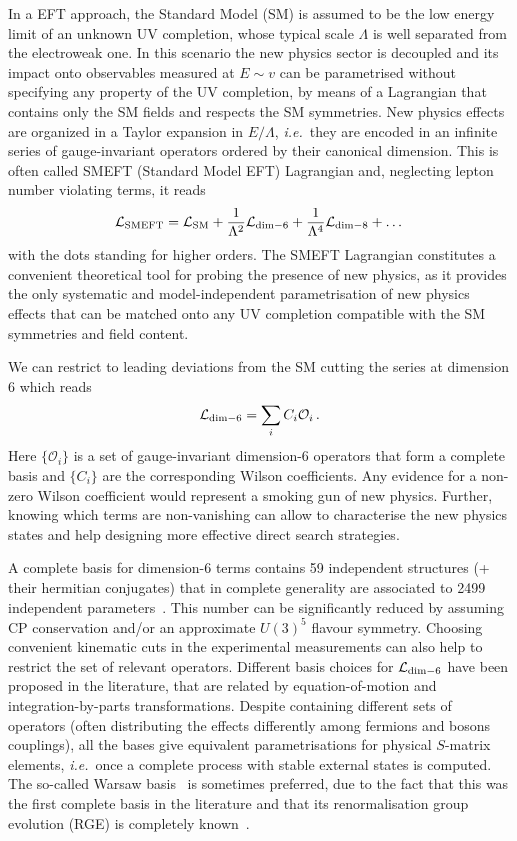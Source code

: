 In a EFT approach, the Standard Model (SM) is assumed to be the low energy limit of an unknown UV completion, whose typical scale $\Lambda$ is well separated from the electroweak one.
In this scenario the new physics sector is decoupled and its impact onto observables measured at $E\sim v$ can be parametrised without specifying any property of the UV completion, by means of a Lagrangian that contains only the SM fields and respects the SM symmetries.
New physics effects are organized in a Taylor expansion in $E/\Lambda$, \emph{i.e.}\ they are encoded in an infinite series of gauge-invariant operators ordered by their canonical dimension.
This is often called SMEFT (Standard Model EFT) Lagrangian and, neglecting lepton number violating terms, it reads
\begin{equation}
 \mathcal{L}_{\rm SMEFT} = \mathcal{L}_{\rm SM} + \frac{1}{\Lambda^2}\mathcal{L}_{\rm dim-6} + \frac{1}{\Lambda^4}\mathcal{L}_{\rm dim-8} + \dots
\end{equation} 
with the dots standing for higher orders.
The SMEFT Lagrangian constitutes a convenient theoretical tool for probing the presence of new physics, as it provides the only systematic and model-independent parametrisation of new physics effects that can be matched onto any UV completion compatible with the SM symmetries and field content.

We can restrict to leading deviations from the SM cutting the series at dimension 6 which reads
\begin{equation}
 \mathcal{L}_{\rm dim-6} = \sum_i C_i \mathcal{O}_i\,.
\end{equation} 
Here $\{\mathcal{O}_i\}$ is a set of gauge-invariant dimension-6 operators that form a complete basis and $\{C_i\}$ are the corresponding Wilson coefficients.
%
Any evidence for a non-zero Wilson coefficient would represent a smoking gun of new physics.
Further, knowing which terms are non-vanishing can allow to characterise the new physics states and help designing more effective direct search strategies.


A complete basis for dimension-6 terms contains 59 independent structures (+ their hermitian conjugates) that in complete generality are associated to 2499 independent parameters~\cite{Alonso:2013hga}.
This number can be significantly reduced by assuming CP conservation and/or an approximate $U(3)^5$ flavour symmetry.
Choosing convenient kinematic cuts in the experimental measurements can also help to restrict the set of relevant operators.
Different basis choices for $\mathcal{L}_{\rm dim-6}$ have been proposed in the literature, that are related by equation-of-motion and integration-by-parts transformations. 
Despite containing different sets of operators (often distributing the effects differently among fermions and bosons couplings), all the bases give equivalent parametrisations for physical $S$-matrix elements, \emph{i.e.}\ once a complete process with stable external states is computed. 
The so-called Warsaw basis~\cite{Grzadkowski:2010es} is sometimes preferred, due to the fact that this was the first complete basis in the literature and that its renormalisation group evolution (RGE) is completely known~\cite{Jenkins:2013zja,Jenkins:2013wua,Alonso:2013hga,Grojean:2013kd,Alonso:2014zka}.

